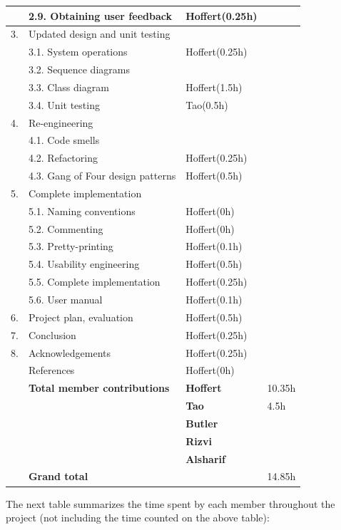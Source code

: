 \documentclass[12pt,a4paper]{article}
\begin{document}
\begin{longtable}{| p{0.2cm} p{6.25cm} | p{3cm}| p{5cm} |}
   & 2.9. Obtaining user feedback & Hoffert(0.25h) &  \\ \hline
  3. & Updated design and unit testing &  &  \\ \hline
   & 3.1. System operations & Hoffert(0.25h) &  \\ \hline
   & 3.2. Sequence diagrams &  &  \\ \hline
   & 3.3. Class diagram & Hoffert(1.5h) &  \\ \hline
   & 3.4. Unit testing & Tao(0.5h) &  \\ \hline
  4. & Re-engineering &  &  \\ \hline
   & 4.1. Code smells &  &  \\ \hline
   & 4.2. Refactoring & Hoffert(0.25h) &  \\ \hline
   & 4.3. Gang of Four design patterns & Hoffert(0.5h) &  \\ \hline
  5. & Complete implementation &  &  \\ \hline
   & 5.1. Naming conventions & Hoffert(0h) &  \\ \hline
   & 5.2. Commenting & Hoffert(0h) &  \\ \hline
   & 5.3. Pretty-printing & Hoffert(0.1h) &  \\ \hline
   & 5.4. Usability engineering & Hoffert(0.5h) &  \\ \hline
   & 5.5. Complete implementation & Hoffert(0.25h) &  \\ \hline
   & 5.6. User manual & Hoffert(0.1h) &  \\ \hline
  6. & Project plan, evaluation & Hoffert(0.5h) &  \\ \hline
  7. & Conclusion & Hoffert(0.25h) &  \\ \hline
  8. & Acknowledgements & Hoffert(0.25h) &  \\ \hline
   & References & Hoffert(0h) &  \\ \hline
    & \textbf{Total member contributions} & \textbf{Hoffert} & 10.35h \\ \cline{3-4}
    &  & \textbf{Tao} & 4.5h \\ \cline{3-4}
    &  & \textbf{Butler} & \\ \cline{3-4}
    &  & \textbf{Rizvi} & \\ \cline{3-4}
    &  & \textbf{Alsharif} & \\ \hline
    & \textbf{Grand total} &  & 14.85h \\ \hline
\end{longtable}

The next table summarizes the time spent by each member throughout the project (not including the time counted on the above table):
\end{document}
